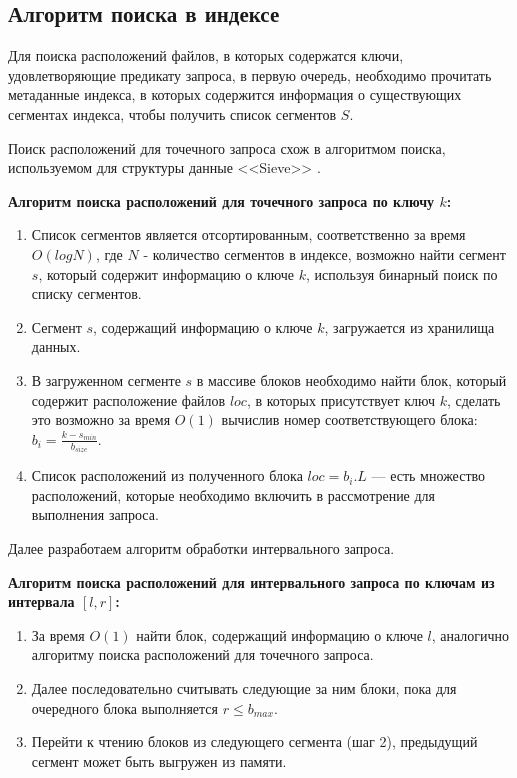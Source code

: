 \subsection{Алгоритм поиска в индексе}\label{search}

Для поиска расположений файлов, в которых содержатся ключи, удовлетворяющие предикату запроса, в первую очередь, необходимо прочитать метаданные индекса, в которых содержится информация о существующих сегментах индекса, чтобы получить список сегментов $S$.

Поиск расположений для точечного запроса схож в алгоритмом поиска, используемом для структуры данные {<<Sieve>>} \cite{Sieve}.

\textbf{Алгоритм поиска расположений для точечного запроса по ключу $k$:}
\begin{enumerate}
    \item Список сегментов является отсортированным, соответственно за время $O(logN)$, где $N$ - количество сегментов в индексе, возможно найти сегмент $s$, который содержит информацию о ключе $k$, используя бинарный поиск по списку сегментов.
    \item Сегмент $s$, содержащий информацию о ключе $k$, загружается из хранилища данных.
    \item В загруженном сегменте $s$ в массиве блоков необходимо найти блок, который содержит расположение файлов $loc$, в которых присутствует ключ $k$, сделать это возможно за время $O(1)$ вычислив номер соответствующего блока: $b_{i} = \frac{k - s_{min}}{b_{size}}$.
    \item Список расположений из полученного блока $loc = b_{i}.L$ --- есть множество расположений, которые необходимо включить в рассмотрение для выполнения запроса.
\end{enumerate}

Далее разработаем алгоритм обработки интервального запроса.

\textbf{Алгоритм поиска расположений для интервального запроса по ключам из интервала $[l, r]$:}
\begin{enumerate}
    \item За время $O(1)$ найти блок, содержащий информацию о ключе $l$, аналогично алгоритму поиска расположений для точечного запроса.
    \item Далее последовательно считывать следующие за ним блоки, пока для очередного блока выполняется $r \leq b_{max}$.
    \item Перейти к чтению блоков из следующего сегмента (шаг 2), предыдущий сегмент может быть выгружен из памяти.
\end{enumerate}
